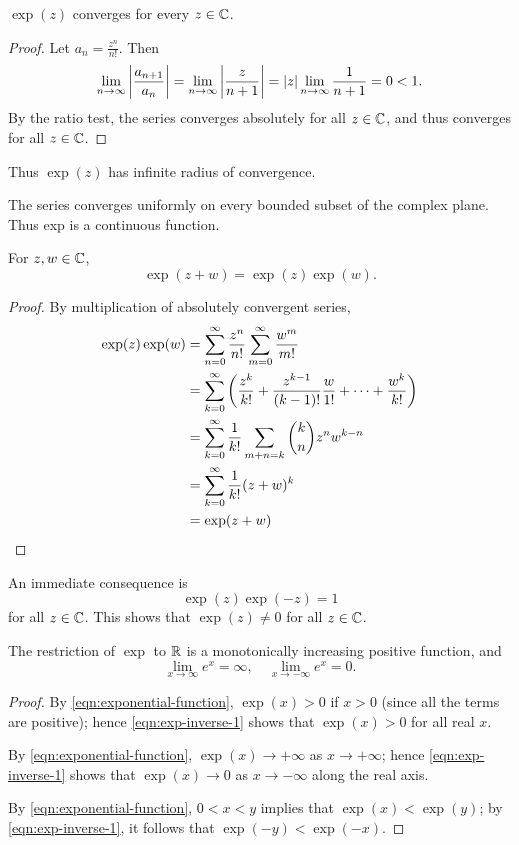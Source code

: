 \begin{lemma}
$\exp(z)$ converges for every $z\in\mathbb C$.
\end{lemma}

\begin{proof}
Let $a_n=\frac{z^n}{n!}$. Then
\[\lim_{n\to\infty}\left|\frac{a_{n+1}}{a_n}\right|=\lim_{n\to\infty}\left|\frac{z}{n+1}\right|=|z|\lim_{n\to\infty}\frac{1}{n+1}=0<1.\]
By the ratio test, the series converges absolutely for all $z\in\mathbb C$, and thus converges for all $z\in\mathbb C$.
\end{proof}

Thus $\exp(z)$ has infinite radius of convergence.

The series converges uniformly on every bounded subset of the complex plane. Thus exp is a continuous function. 

\begin{lemma}
For $z,w\in\mathbb C$,
\begin{equation}\label{eqn:exp-addition-formula}
\exp(z+w)=\exp(z)\exp(w).
\end{equation}
\end{lemma}

\begin{proof}
By multiplication of absolutely convergent series,
\begin{align*}
\exp(z)\exp(w)
&=\sum_{n=0}^{\infty}\frac{z^n}{n!}\sum_{m=0}^{\infty}\frac{w^m}{m!}\\
&=\sum_{k=0}^{\infty}\left(\frac{z^k}{k!}+\frac{z^{k-1}}{(k-1)!}\frac{w}{1!}+\cdots+\frac{w^k}{k!}\right)\\
&=\sum_{k=0}^{\infty}\frac{1}{k!}\sum_{m+n=k}\binom{k}{n}z^n w^{k-n}\\
&=\sum_{k=0}^{\infty}\frac{1}{k!}(z+w)^k\\
&=\exp(z+w)
\end{align*}
\end{proof}

An immediate consequence is
\begin{equation}\label{eqn:exp-inverse-1}
\exp(z)\exp(-z)=1
\end{equation}
for all $z\in\mathbb C$.
This shows that $\exp(z)\neq0$ for all $z\in\mathbb C$.

\begin{lemma}
The restriction of $\exp$ to $\mathbb R$ is a monotonically increasing positive function, and
\[\lim_{x\to\infty}e^x=\infty,\quad \lim_{x\to-\infty}e^x=0.\]
\end{lemma}

\begin{proof}
By \eqref{eqn:exponential-function}, $\exp(x)>0$ if $x>0$ (since all the terms are positive); hence \eqref{eqn:exp-inverse-1} shows that $\exp(x)>0$ for all real $x$. 

By \eqref{eqn:exponential-function}, $\exp(x)\to+\infty$ as $x\to+\infty$; hence \eqref{eqn:exp-inverse-1} shows that $\exp(x)\to 0$ as $x\to-\infty$ along the real axis. 

By \eqref{eqn:exponential-function}, $0<x<y$ implies that $\exp(x)<\exp(y)$; by \eqref{eqn:exp-inverse-1}, it follows that $\exp(-y)<\exp(-x)$.
\end{proof}

